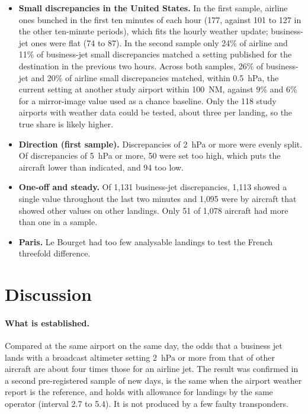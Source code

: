 \documentclass[11pt]{article}
\begin{document}
\begin{itemize}
\item \textbf{Small discrepancies in the United States.} In the first sample, airline ones bunched in the first ten minutes of each hour (177, against 101 to 127 in the other ten-minute periods), which fits the hourly weather update; business-jet ones were flat (74 to 87). In the second sample only 24\% of airline and 11\% of business-jet small discrepancies matched a setting published for the destination in the previous two hours. Across both samples, 26\% of business-jet and 20\% of airline small discrepancies matched, within 0.5~hPa, the current setting at another study airport within 100~NM, against 9\% and 6\% for a mirror-image value used as a chance baseline. Only the 118 study airports with weather data could be tested, about three per landing, so the true share is likely higher.
\item \textbf{Direction (first sample).} Discrepancies of 2~hPa or more were evenly split. Of discrepancies of 5~hPa or more, 50 were set too high, which puts the aircraft lower than indicated, and 94 too low.
\item \textbf{One-off and steady.} Of 1{,}131 business-jet discrepancies, 1{,}113 showed a single value throughout the last two minutes and 1{,}095 were by aircraft that showed other values on other landings. Only 51 of 1{,}078 aircraft had more than one in a sample.
\item \textbf{Paris.} Le Bourget had too few analysable landings to test the French threefold difference.
\end{itemize}

\section{Discussion}\label{sec:discussion}

\paragraph{What is established.} Compared at the same airport on the same day, the odds that a business jet lands with a broadcast altimeter setting 2~hPa or more from that of other aircraft are about four times those for an airline jet. The result was confirmed in a second pre-registered sample of new days, is the same when the airport weather report is the reference, and holds with allowance for landings by the same operator (interval 2.7 to 5.4). It is not produced by a few faulty transponders.
\end{document}
